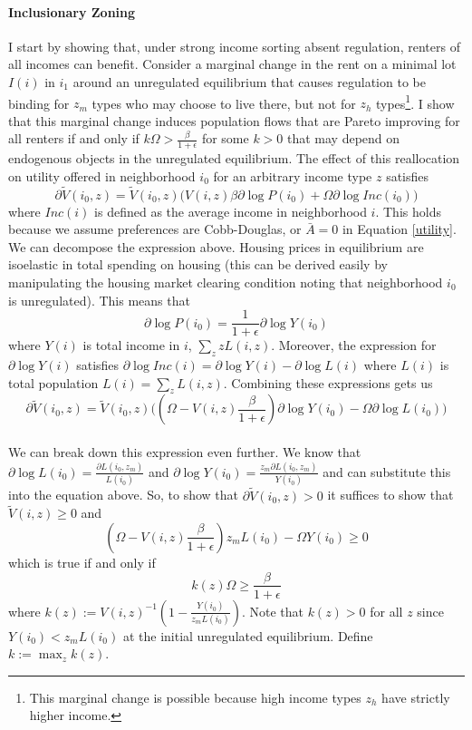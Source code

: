 \documentclass[12pt]{article}
\begin{document}
	\paragraph*{Inclusionary Zoning}
	
	 I start by showing that, under strong income sorting absent regulation, renters of all incomes can benefit. Consider a marginal change in the rent on a minimal lot $I(i)$ in $i_{1}$ around an unregulated equilibrium that causes regulation to be binding for $z_{m}$ types who may choose to live there, but not for $z_{h}$ types\footnote{This marginal change is possible because high income types $z_{h}$ have strictly higher income.}. I show that this marginal change induces population flows that are Pareto improving for all renters if and only if $k \Omega > \frac{\beta}{1 + \epsilon}$ for some $k > 0$ that may depend on endogenous objects in the unregulated equilibrium. The effect of this reallocation on utility offered in neighborhood $i_{0}$ for an arbitrary income type $z$ satisfies $$\partial \tilde{V}(i_{0}, z) = \tilde{V}(i_{0}, z)\bigg(V(i, z)\beta \partial \log P(i_{0}) + \Omega \partial \log Inc(i_{0}) \bigg)$$
  	where $Inc(i)$ is defined as the average income in neighborhood $i$. This holds because we assume preferences are Cobb-Douglas, or $\bar{A} = 0$ in Equation \eqref{utility}. We can decompose the expression above. Housing prices in equilibrium are isoelastic in total spending on housing (this can be derived easily by manipulating the housing market clearing condition noting that neighborhood $i_{0}$ is unregulated). This means that 
	$$\partial \log P(i_{0}) = \frac{1}{1 + \epsilon}\partial \log Y(i_{0})$$	
	where $Y(i)$ is total income in $i$, $\sum_{z}zL(i, z)$. Moreover, the expression for $\partial \log Y(i)$ satisfies $\partial \log Inc(i) = \partial \log Y(i) - \partial \log L(i)$ where $L(i)$ is total population $L(i) = \sum_{z}L(i, z)$. Combining these expressions gets us $$\partial \tilde{V}(i_{0}, z) = \tilde{V}(i_{0}, z)\bigg( (\Omega - V(i, z)\frac{\beta}{1 + \epsilon}) \partial \log Y(i_{0}) - \Omega \partial \log L(i_{0})  \bigg) $$
	
	\paragraph*{}
	We can break down this expression even further. We know that $\partial \log L(i_{0}) = \frac{\partial L(i_{0}, z_{m})}{L(i_{0})}$ and $\partial \log Y(i_{0}) = \frac{z_{m}\partial L(i_{0}, z_{m})}{Y(i_{0})}$ and can substitute this into the equation above. So, to show that $\partial \tilde{V}(i_{0}, z) > 0$ it suffices to show that $\tilde{V}(i, z) \geq 0$ and $$(\Omega - V(i, z)\frac{\beta}{1 + \epsilon}) z_{m}L(i_{0}) - \Omega Y(i_{0}) \geq 0$$ 
	which is true if and only if $$k(z)\Omega \geq \frac{\beta}{1 + \epsilon}$$ where $k(z) := V(i, z)^{-1}(1 - \frac{Y(i_{0})}{z_{m}L(i_{0})})$. Note that $k(z) > 0$ for all $z$ since $Y(i_{0}) < z_{m}L(i_{0})$ at the initial unregulated equilibrium. Define $k := \max_{z}k(z)$. 
	
\end{document}
